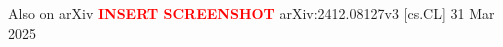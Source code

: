 \begin{frame}{Also on arXiv}
    \centering
    \textcolor{red}{\textbf{INSERT SCREENSHOT}}
    \vfill
    arXiv:2412.08127v3 [cs.CL] 31 Mar 2025
\end{frame}
